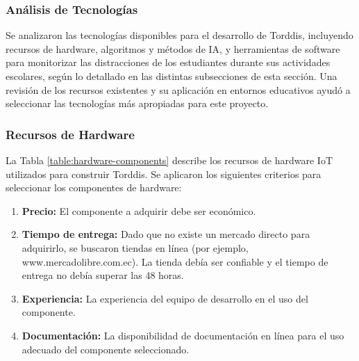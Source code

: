 \documentclass[a4paper,fleqn]{cas-sc}
\begin{document}
	\subsubsection{Análisis de Tecnologías}
	Se analizaron las tecnologías disponibles para el desarrollo de Torddis, incluyendo recursos de hardware, algoritmos y métodos de IA, y herramientas de software para monitorizar las distracciones de los estudiantes durante sus actividades escolares, según lo detallado en las distintas subsecciones de esta sección. Una revisión de los recursos existentes y su aplicación en entornos educativos ayudó a seleccionar las tecnologías más apropiadas para este proyecto.
	
	\subsubsection*{Recursos de Hardware}
	La Tabla \ref{table:hardware-components} describe los recursos de hardware IoT utilizados para construir Torddis. Se aplicaron los siguientes criterios para seleccionar los componentes de hardware:
	\begin{enumerate}
		\item \textbf{Precio:} El componente a adquirir debe ser económico.
		\item \textbf{Tiempo de entrega:} Dado que no existe un mercado directo para adquirirlo, se buscaron tiendas en línea (por ejemplo, www.mercadolibre.com.ec). La tienda debía ser confiable y el tiempo de entrega no debía superar las 48 horas.
		\item \textbf{Experiencia:} La experiencia del equipo de desarrollo en el uso del componente.
		\item \textbf{Documentación:} La disponibilidad de documentación en línea para el uso adecuado del componente seleccionado.
	\end{enumerate}
	
\end{document}
